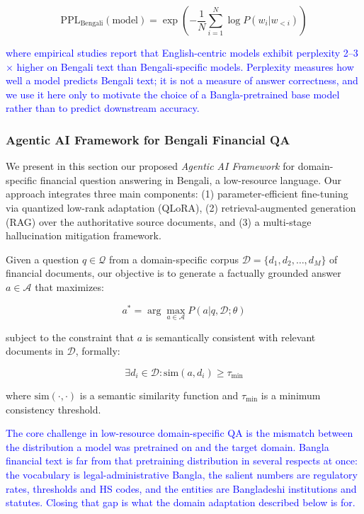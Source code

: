 \documentclass{article}
\newcommand{\revised}[1]{\textcolor{blue}{#1}}
\newcommand{\revised}[1]{#1}
\begin{document}
\begin{equation}
\text{PPL}_{\text{Bengali}}(\text{model}) = \exp\left(-\frac{1}{N}\sum_{i=1}^{N}\log P(w_i|w_{<i})\right)
\end{equation}

\revised{where empirical studies report that English-centric models exhibit perplexity
2--3$\times$ higher on Bengali text than Bengali-specific models. Perplexity measures
how well a model predicts Bengali text; it is not a measure of answer correctness, and
we use it here only to motivate the choice of a Bangla-pretrained base model rather than
to predict downstream accuracy.}

\subsubsection{Agentic AI Framework for Bengali Financial QA}
\label{sec:methodology}

We present in this section our proposed \textit{Agentic AI Framework} for
domain-specific financial question answering in Bengali, a low-resource language. Our
approach integrates three main components: (1) parameter-efficient fine-tuning via
quantized low-rank adaptation (QLoRA), (2) retrieval-augmented generation (RAG) over
the authoritative source documents, and (3) a multi-stage hallucination mitigation
framework.

Given a question $q \in \mathcal{Q}$ from a domain-specific corpus $\mathcal{D} =
\{d_1, d_2, \ldots, d_M\}$ of financial documents, our objective is to generate a
factually grounded answer $a \in \mathcal{A}$ that maximizes:

\begin{equation}
a^* = \arg\max_{a \in \mathcal{A}} P(a | q, \mathcal{D}; \theta)
\end{equation}

subject to the constraint that $a$ is semantically consistent with relevant documents
in $\mathcal{D}$, formally:

\begin{equation}
\exists d_i \in \mathcal{D} : \text{sim}(a, d_i) \geq \tau_{\text{min}}
\end{equation}

where $\text{sim}(\cdot, \cdot)$ is a semantic similarity function and
$\tau_{\text{min}}$ is a minimum consistency threshold.

\revised{The core challenge in low-resource domain-specific QA is the mismatch between
the distribution a model was pretrained on and the target domain. Bangla financial text
is far from that pretraining distribution in several respects at once: the vocabulary is
legal-administrative Bangla, the salient numbers are regulatory rates, thresholds and HS
codes, and the entities are Bangladeshi institutions and statutes. Closing that gap is
what the domain adaptation described below is for.}
\end{document}
